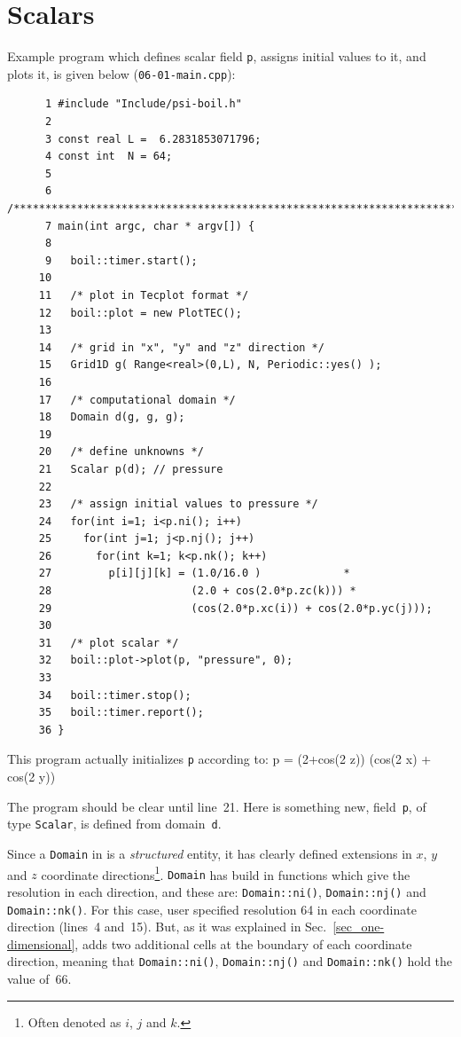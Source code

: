 \section{Scalars}
\label{sec_scalars}

Example program which defines scalar field {\tt p}, assigns initial
values to it, and plots it, is given below ({\tt 06-01-main.cpp}):
%
{\small \begin{verbatim}
      1 #include "Include/psi-boil.h"
      2
      3 const real L =  6.2831853071796;
      4 const int  N = 64;
      5
      6 /****************************************************************************/
      7 main(int argc, char * argv[]) {
      8
      9   boil::timer.start();
     10
     11   /* plot in Tecplot format */
     12   boil::plot = new PlotTEC();
     13
     14   /* grid in "x", "y" and "z" direction */
     15   Grid1D g( Range<real>(0,L), N, Periodic::yes() );
     16
     17   /* computational domain */
     18   Domain d(g, g, g);
     19
     20   /* define unknowns */
     21   Scalar p(d); // pressure
     22
     23   /* assign initial values to pressure */
     24   for(int i=1; i<p.ni(); i++)
     25     for(int j=1; j<p.nj(); j++)
     26       for(int k=1; k<p.nk(); k++)
     27         p[i][j][k] = (1.0/16.0 )             *
     28                      (2.0 + cos(2.0*p.zc(k))) *
     29                      (cos(2.0*p.xc(i)) + cos(2.0*p.yc(j)));
     30
     31   /* plot scalar */
     32   boil::plot->plot(p, "pressure", 0);
     33
     34   boil::timer.stop();
     35   boil::timer.report();
     36 }
\end{verbatim}}
%
This program actually initializes {\tt p} according to:
%
\be
  p =  (2+cos(2 z)) (cos(2 x) + cos(2 y))
  \label{eq_pressure_init}
\ee

The program should be clear until line~21. Here is something new, field~{\tt p},
of type {\tt Scalar}, is defined from domain~{\tt d}. 

Since a {\tt Domain} in {\psiboil} is a {\em structured} entity, it has clearly 
defined extensions in $x$, $y$ and $z$ coordinate directions\footnote{Often denoted
as $i$, $j$ and $k$.}. {\tt Domain} has build in functions which give the resolution
in each direction, and these are: {\tt Domain::ni()}, {\tt Domain::nj()} and
{\tt Domain::nk()}. For this case, user specified resolution 64 in each coordinate
direction (lines~4 and~15). But, as it was explained in Sec.~\ref{sec_one-dimensional},
{\psiboil} adds two additional cells at the boundary of each coordinate direction,
meaning that {\tt Domain::ni()}, {\tt Domain::nj()} and {\tt Domain::nk()} hold the
value of~66. 

